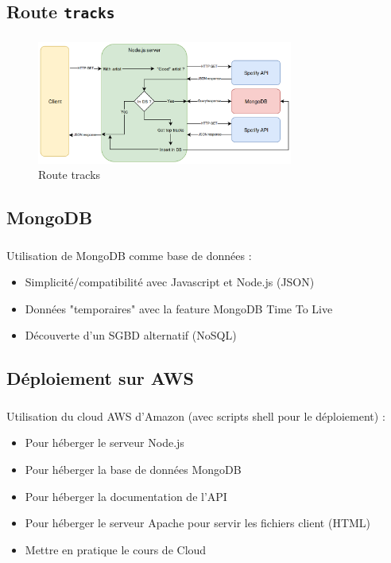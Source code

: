 \documentclass[10pt]{beamer}
\begin{document}
\subsection{Route \texttt{tracks}}
\begin{frame}
	\frametitle{\secname}
	\framesubtitle{\subsecname}
	\begin{figure}
		\begin{center}
			\includegraphics[width=0.75\textwidth]{images/tracks.png}
		\end{center}
		\caption{Route tracks}
	\end{figure}
\end{frame}

\subsection{MongoDB}
\begin{frame}
	\frametitle{\secname}
	\framesubtitle{\subsecname}
	Utilisation de MongoDB comme base de données :
	\begin{itemize}
		\item Simplicité/compatibilité avec Javascript et Node.js (JSON)
		\item Données "temporaires" avec la feature MongoDB Time To Live
		\item Découverte d'un SGBD alternatif (NoSQL)
	\end{itemize}
\end{frame}

\subsection{Déploiement sur AWS}
\begin{frame}
	\frametitle{\secname}
	\framesubtitle{\subsecname}
	Utilisation du cloud AWS d'Amazon (avec scripts shell pour le déploiement) :
	\begin{itemize}
		\item Pour héberger le serveur Node.js
		\item Pour héberger la base de données MongoDB
		\item Pour héberger la documentation de l'API
		\item Pour héberger le serveur Apache pour servir les fichiers client (HTML)
		\item Mettre en pratique le cours de Cloud
	\end{itemize}
\end{frame}
\end{document}
